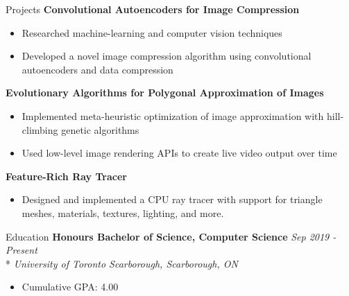 \documentclass[11pt, letterpaper]{article}
\begin{document}
\begin{section}{Projects}
\textbf{Convolutional Autoencoders for Image Compression}
\begin{itemize}
  \item Researched machine-learning and computer vision techniques
  \item Developed a novel image compression algorithm using convolutional autoencoders and data compression\\
\end{itemize}

\textbf{Evolutionary Algorithms for Polygonal Approximation of Images}
\begin{itemize}
  \item Implemented meta-heuristic optimization of image approximation with hill-climbing genetic algorithms
  \item Used low-level image rendering APIs to create live video output over time\\
\end{itemize}

\textbf{Feature-Rich Ray Tracer}
\begin{itemize}
  \item Designed and implemented a CPU ray tracer with support for triangle meshes, materials, textures, lighting, and more.
\end{itemize}

\end{section}

\begin{section}{Education}
\textbf{Honours Bachelor of Science, Computer Science}
\hfill
\textit{Sep 2019 - Present}\\*
\textit{University of Toronto Scarborough, Scarborough, ON}
\begin{itemize}
  \item Cumulative GPA: 4.00
\end{itemize}

\end{section}
\end{document}
